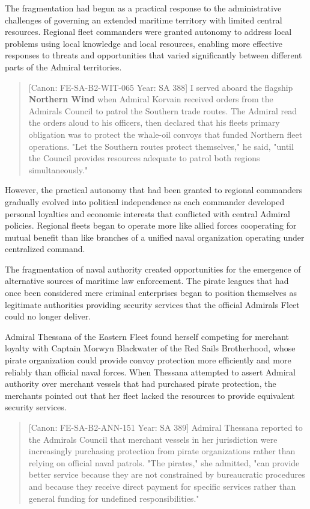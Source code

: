 The fragmentation had begun as a practical response to the
administrative challenges of governing an extended maritime territory
with limited central resources. Regional fleet commanders were granted
autonomy to address local problems using local knowledge and local
resources, enabling more effective responses to threats and
opportunities that varied significantly between different parts of the
Admiral territories.

\begin{quote}
{[}Canon: FE-SA-B2-WIT-065 \textbar{} Year: SA 388{]} I served aboard
the flagship \textbf{Northern Wind} when Admiral Korvain received orders
from the Admiral\textquotesingle s Council to patrol the Southern trade
routes. The Admiral read the orders aloud to his officers, then declared
that his fleet\textquotesingle s primary obligation was to protect the
whale-oil convoys that funded Northern fleet operations. "Let the
Southern routes protect themselves," he said, "until the Council
provides resources adequate to patrol both regions simultaneously."
\end{quote}

However, the practical autonomy that had been granted to regional
commanders gradually evolved into political independence as each
commander developed personal loyalties and economic interests that
conflicted with central Admiral policies. Regional fleets began to
operate more like allied forces cooperating for mutual benefit than like
branches of a unified naval organization operating under centralized
command.

The fragmentation of naval authority created opportunities for the
emergence of alternative sources of maritime law enforcement. The pirate
leagues that had once been considered mere criminal enterprises began to
position themselves as legitimate authorities providing security
services that the official Admiral\textquotesingle s Fleet could no
longer deliver.

Admiral Thessana of the Eastern Fleet found herself competing for
merchant loyalty with Captain Morwyn Blackwater of the Red Sails
Brotherhood, whose pirate organization could provide convoy protection
more efficiently and more reliably than official naval forces. When
Thessana attempted to assert Admiral authority over merchant vessels
that had purchased pirate protection, the merchants pointed out that her
fleet lacked the resources to provide equivalent security services.

\begin{quote}
{[}Canon: FE-SA-B2-ANN-151 \textbar{} Year: SA 389{]} Admiral Thessana
reported to the Admiral\textquotesingle s Council that merchant vessels
in her jurisdiction were increasingly purchasing protection from pirate
organizations rather than relying on official naval patrols. "The
pirates," she admitted, "can provide better service because they are not
constrained by bureaucratic procedures and because they receive direct
payment for specific services rather than general funding for undefined
responsibilities."
\end{quote}

